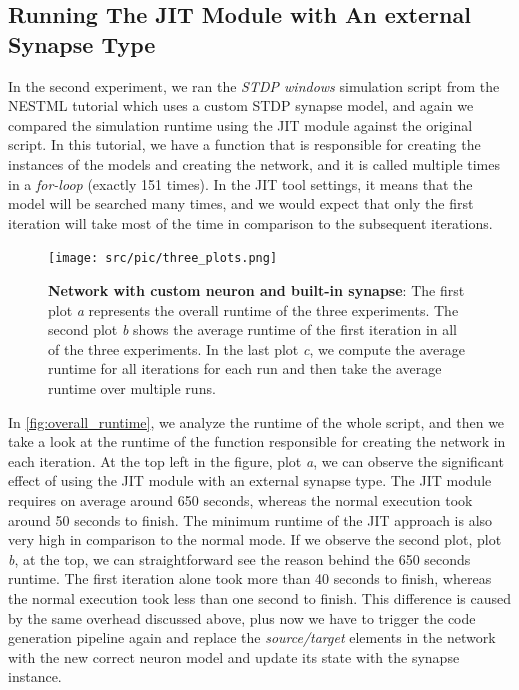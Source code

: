 \subsection*{Running The JIT Module with An external Synapse Type}

In the second experiment, we ran the \emph{STDP windows} simulation script from the NESTML tutorial which uses a custom STDP synapse model, and again we compared the simulation runtime using the JIT module against the original script. In this tutorial, we have a function that is responsible for creating the instances of the models and creating the network, and it is called multiple times in a \emph{for-loop} (exactly 151 times). In the JIT tool settings, it means that the model will be searched many times, and we would expect that only the first iteration will take most of the time in comparison to the subsequent iterations. 

\begin{figure}[ht!]
    \centering
    \texttt{[image: src/pic/three\_plots.png]}
    \caption{\textbf{Network with custom neuron and built-in synapse}: The first plot \emph{a} represents the overall runtime of the three experiments. The second plot \emph{b} shows the average runtime of the first iteration in all of the three experiments. In the last plot \emph{c}, we compute the average runtime for all iterations for each run and then take the average runtime over multiple runs.}
    \label{fig:overall_runtime}
\end{figure}

In \autoref{fig:overall_runtime}, we analyze the runtime of the whole script, and then we take a look at the runtime of the function responsible for creating the network in each iteration. At the top left in the figure, plot \emph{a}, we can observe the significant effect of using the JIT module with an external synapse type. The JIT module requires on average around 650 seconds, whereas the normal execution took around 50 seconds to finish. The minimum runtime of the JIT approach is also very high in comparison to the normal mode. If we observe the second plot, plot \emph{b}, at the top, we can straightforward see the reason behind the 650 seconds runtime. The first iteration alone took more than 40 seconds to finish, whereas the normal execution took less than one second to finish. This difference is caused by the same overhead discussed above, plus now we have to trigger the code generation pipeline again and replace the \emph{source/target} elements in the network with the new correct neuron model and update its state with the synapse instance. 

